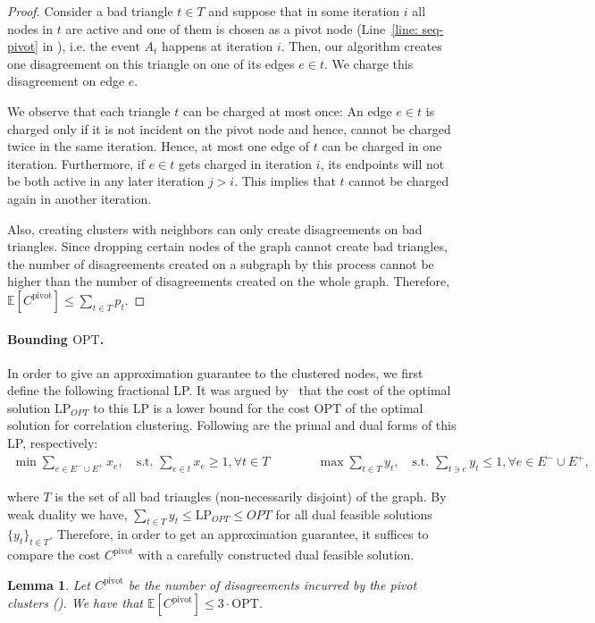 \documentclass[10pt,a4paper]{article}
\newtheorem{lemma}{Lemma}[section]
\newcommand{\E}{\mathbb{E}}
\newcommand{\lp}{\textrm{LP}\xspace}
\newcommand{\ourcluster}{\ensuremath{C^{\textrm{pivot}}}\xspace}
\newcommand{\opt}{\textrm{OPT}\xspace}
\begin{document}
\begin{proof}
    Consider a bad triangle $t \in T$ and suppose that in some iteration $i$ all nodes in $t$ are active and one of them is chosen as a pivot node (Line~\ref{line: seq-pivot} in ), i.e. the event $A_t$ happens at iteration $i$.
    Then, our algorithm creates one disagreement on this triangle on one of its edges $e \in t$.
    We charge this disagreement on edge $e$.
    
    We observe that each triangle $t$ can be charged at most once:
    An edge $e \in t$ is charged only if it is not incident on the pivot node and hence, cannot be charged twice in the same iteration. 
    Hence, at most one edge of $t$ can be charged in one iteration.
    Furthermore, if $e\in t$ gets charged in iteration $i$, its endpoints will not be both active in any later iteration $j > i$.
    This implies that $t$ cannot be charged again in another iteration.
    
    Also, creating clusters with neighbors can only create disagreements on bad triangles.
    Since dropping certain nodes of the graph cannot create bad triangles, the number of disagreements created on a subgraph by this process cannot be higher than the number of disagreements created on the whole graph.
    Therefore, $\E[\ourcluster] \leq \sum_{t \in T} p_t$.
\end{proof}


\paragraph*{Bounding $\opt$.}
In order to give an approximation guarantee to the clustered nodes, we first define the following fractional \lp. 
It was argued by~\cite{ailon2008aggregating} that the cost of the optimal solution $\lp_{OPT}$ to this \lp is a lower bound for the cost $\opt$ of the optimal solution for correlation clustering. Following are the primal and dual forms of this \lp, respectively:
    \begin{align}\label{formula:LP}
        \min \sum_{e\in E^{-}\cup E^{+}}x_e, \quad
        \text{s.t. } \sum_{e\in t}x_e \geq 1, \forall t\in T  \quad \qquad 
        &\max\sum_{t\in T}y_t, \quad
        \text{s.t. } \sum_{t\ni e}y_t \leq 1, \forall e\in E^-\cup E^+,
    \end{align}

where $T$ is the set of all bad triangles (non-necessarily disjoint) of the graph. 
By weak duality we have, $\sum_{t \in T}y_t \leq \lp_{OPT} \leq OPT$ for all dual feasible solutions $\{y_t\}_{t\in T}$. 
Therefore, in order to get an approximation guarantee, it suffices to compare the cost \ourcluster with a carefully constructed dual feasible solution. 
\begin{lemma}
    \label{lemma: pivotcost}
  Let \ourcluster be the number of disagreements incurred by the pivot clusters (). We have that $\E[\ourcluster] \leq 3 \cdot \opt$.
\end{lemma}
\end{document}
